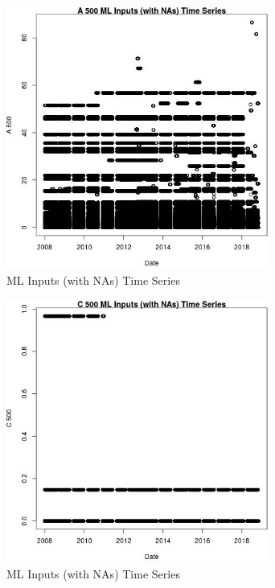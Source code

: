 \begin{figure} 
\centering  
\includegraphics[width=0.77\textwidth]{Code_Outputs/Report_ML_input_PM25_Step4_part_e_de_duplicated_aves_compiled_2019-05-20wNAs_A_500vDate.jpg} 
\caption{\label{fig:Report_ML_input_PM25_Step4_part_e_de_duplicated_aves_compiled_2019-05-20wNAsA_500vDate}ML Inputs (with NAs) Time Series} 
\end{figure} 
 

\begin{figure} 
\centering  
\includegraphics[width=0.77\textwidth]{Code_Outputs/Report_ML_input_PM25_Step4_part_e_de_duplicated_aves_compiled_2019-05-20wNAs_C_500vDate.jpg} 
\caption{\label{fig:Report_ML_input_PM25_Step4_part_e_de_duplicated_aves_compiled_2019-05-20wNAsC_500vDate}ML Inputs (with NAs) Time Series} 
\end{figure} 
 


